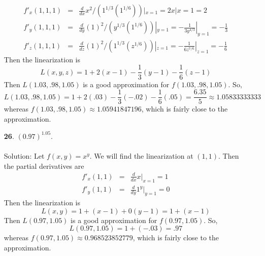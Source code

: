 \documentclass[12pt]{amsbook}
\begin{document}
\begin{enumerate}
\begin{eqnarray*}
f'_x(1,1,1)&=&\frac{d}{dx}x^2/(1^{1/3}(1^{1/6}))|_{x=1}=2x|{x=1}=2 \\
f'_y(1,1,1)&=&\frac{d}{dy}(1)^2/(y^{1/3}(1^{1/6}))|_{y=1}=-\frac{1}{3y^{4/3}}|_{y=1}=-\frac{1}{3} \\
f'_z(1,1,1)&=&\frac{d}{dz}(1)^2/(1^{1/3}(z^{1/6}))|_{z=1}=-\frac{1}{6z^{7/6}}|_{z=1}=-\frac{1}{6}
\end{eqnarray*}
Then the linearization is 
$$L(x,y,z)=1+2(x-1)-\frac{1}{3}(y-1)-\frac{1}{6}(z-1)$$
Then $L(1.03,.98,1.05)$ is a good approximation for $f(1.03,.98,1.05)$. So,
$$L(1.03,.98,1.05)=1+2(.03)-\frac{1}{3}(-.02)-\frac{1}{6}(.05)=\frac{6.35}{5}\approx 1.05833333333$$
whereas $f(1.03,.98,1.05) \approx 1.05941847196$, which is fairly close to the approximation.
\\
\item[{\small\bf 26}.] $(0.97)^{1.05}$.
\\
\\
{\sc Solution}: Let $f(x,y)=x^y$. We will find the linearization at $(1,1)$. Then the partial derivatives are
\begin{eqnarray*}
f'_x(1,1)&=&\frac{d}{dx}x|_{x=1}=1 \\
f'_y(1,1)&=&\frac{d}{dy}1^y|_{y=1}=0
\end{eqnarray*}
Then the linearization is 
$$L(x,y)=1+(x-1)+0(y-1)=1+(x-1)$$
Then $L(0.97,1.05)$ is a good approximation for $f(0.97,1.05)$. So,
$$L(0.97,1.05)=1+(-.03)=.97$$
whereas $f(0.97,1.05) \approx 0.968523852779$, which is fairly close to the approximation.
\\
\end{enumerate}
\end{document}
